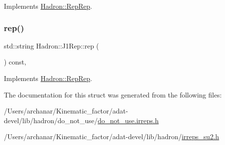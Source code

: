 Implements \mbox{\hyperlink{structHadron_1_1RepRep_ab3213025f6de249f7095892109575fde}{Hadron\+::\+Rep\+Rep}}.

\mbox{\label{structHadron_1_1J1Rep_af725f8ff10c84cda5410728ce30697da}} 
\subsubsection{\texorpdfstring{rep()}{rep()}\hspace{0.1cm}{\footnotesize\ttfamily [5/5]}}
{\footnotesize\ttfamily std\+::string Hadron\+::\+J1\+Rep\+::rep (\begin{DoxyParamCaption}{ }\end{DoxyParamCaption}) const\hspace{0.3cm}{\ttfamily [inline]}, {\ttfamily [virtual]}}



Implements \mbox{\hyperlink{structHadron_1_1RepRep_ab3213025f6de249f7095892109575fde}{Hadron\+::\+Rep\+Rep}}.



The documentation for this struct was generated from the following files\+:\begin{DoxyCompactItemize}
\item 
/\+Users/archanar/\+Kinematic\+\_\+factor/adat-\/devel/lib/hadron/do\+\_\+not\+\_\+use/\mbox{\hyperlink{adat-devel_2lib_2hadron_2do__not__use_2do__not__use_8irreps_8h}{do\+\_\+not\+\_\+use.\+irreps.\+h}}\item 
/\+Users/archanar/\+Kinematic\+\_\+factor/adat-\/devel/lib/hadron/\mbox{\hyperlink{adat-devel_2lib_2hadron_2irreps__su2_8h}{irreps\+\_\+su2.\+h}}\end{DoxyCompactItemize}
